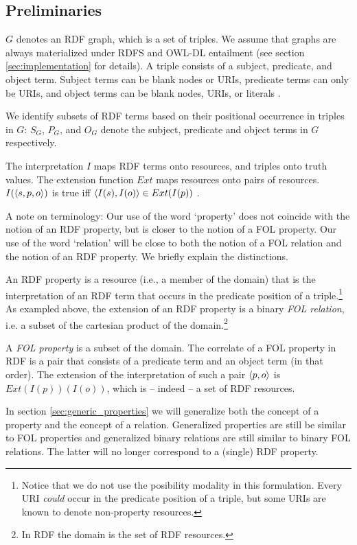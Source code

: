 \subsection{Preliminaries}
\label{sec:preliminaries}

$G$ denotes an RDF graph, which is a set of triples.
We assume that graphs are always materialized under
  RDFS and OWL-DL entailment
  (see section \ref{sec:implementation} for details).
A triple consists of a subject, predicate, and object term.
Subject terms can be blank nodes or URIs, predicate terms can only be URIs,
  and object terms can be blank nodes, URIs,
  or literals \cite{KlyneCarroll2004}.

We identify subsets of RDF terms based on
  their positional occurrence in triples in $G$:
  $S_G$, $P_G$, and $O_G$ denote the subject, predicate and object terms
  in $G$ respectively.

The interpretation $I$ maps RDF terms onto resources,
  and triples onto truth values.
The extension function $Ext$ maps resources onto pairs of resources.
$I(\langle s,p,o\rangle)$ is true iff
  $\langle I(s),I(o)\rangle \in Ext(I(p))$ \cite{Hayes2004}.

A note on terminology: Our use of the word `property' does not coincide
  with the notion of an RDF property, but is closer to the notion
  of a FOL property. Our use of the word `relation' will be close to
  both the notion of a FOL relation and the notion of an RDF property.
  We briefly explain the distinctions.

An RDF property is a resource (i.e., a member of the domain)
  that is the interpretation of
  an RDF term that occurs in the predicate position of a triple.\footnote{
    Notice that we do not use the posibility modality in this formulation.
    Every URI \emph{could} occur in the predicate position of a triple,
      but some URIs are known to denote non-property resources.
  }
As exampled above, the extension of an RDF property is
  a binary \emph{FOL relation},
  i.e. a subset of the cartesian product of the domain.\footnote{
    In RDF the domain is the set of RDF resources.}

A \emph{FOL property} is a subset of the domain.
The correlate of a FOL property in RDF is a pair that consists of
  a predicate term and an object term (in that order).
The extension of the interpretation of such a pair $\langle p,o\rangle$
  is $Ext(I(p))(I(o))$, which is -- indeed -- a set of RDF resources.

In section \ref{sec:generic_properties} we will generalize
  both the concept of a property and the concept of a relation.
Generalized properties are still be similar to FOL properties
  and generalized binary relations are still similar to binary FOL relations.
The latter will no longer correspond to a (single) RDF property.

\begin{comment}
$\equivset{x}$ is the equivalence class for $x$
  under equivalence relation $\approx$.
\end{comment}

